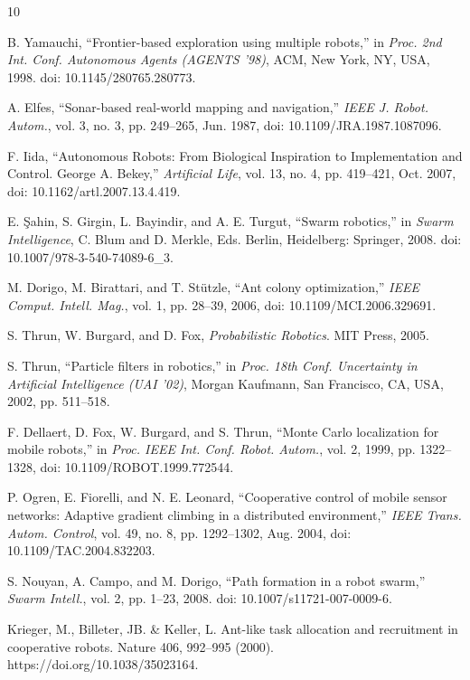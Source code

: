 \documentclass[lettersize,journal]{IEEEtran}
\begin{document}
\begin{thebibliography}{10}

B. Yamauchi, ``Frontier-based exploration using multiple robots,'' in \textit{Proc. 2nd Int. Conf. Autonomous Agents (AGENTS '98)}, ACM, New York, NY, USA, 1998. doi: 10.1145/280765.280773.

A. Elfes, ``Sonar-based real-world mapping and navigation,'' \textit{IEEE J. Robot. Autom.}, vol. 3, no. 3, pp. 249--265, Jun. 1987, doi: 10.1109/JRA.1987.1087096.

F. Iida, ``Autonomous Robots: From Biological Inspiration to Implementation and Control. George A. Bekey,'' \textit{Artificial Life}, vol. 13, no. 4, pp. 419--421, Oct. 2007, doi: 10.1162/artl.2007.13.4.419.

E. Şahin, S. Girgin, L. Bayindir, and A. E. Turgut, ``Swarm robotics,'' in \textit{Swarm Intelligence}, C. Blum and D. Merkle, Eds. Berlin, Heidelberg: Springer, 2008. doi: 10.1007/978-3-540-74089-6\_3.

M. Dorigo, M. Birattari, and T. Stützle, ``Ant colony optimization,'' \textit{IEEE Comput. Intell. Mag.}, vol. 1, pp. 28--39, 2006, doi: 10.1109/MCI.2006.329691.

S. Thrun, W. Burgard, and D. Fox, \textit{Probabilistic Robotics}. MIT Press, 2005.

S. Thrun, ``Particle filters in robotics,'' in \textit{Proc. 18th Conf. Uncertainty in Artificial Intelligence (UAI ’02)}, Morgan Kaufmann, San Francisco, CA, USA, 2002, pp. 511--518.

F. Dellaert, D. Fox, W. Burgard, and S. Thrun, ``Monte Carlo localization for mobile robots,'' in \textit{Proc. IEEE Int. Conf. Robot. Autom.}, vol. 2, 1999, pp. 1322--1328, doi: 10.1109/ROBOT.1999.772544.

P. Ogren, E. Fiorelli, and N. E. Leonard, ``Cooperative control of mobile sensor networks: Adaptive gradient climbing in a distributed environment,'' \textit{IEEE Trans. Autom. Control}, vol. 49, no. 8, pp. 1292--1302, Aug. 2004, doi: 10.1109/TAC.2004.832203.

S. Nouyan, A. Campo, and M. Dorigo, ``Path formation in a robot swarm,'' \textit{Swarm Intell.}, vol. 2, pp. 1--23, 2008. doi: 10.1007/s11721-007-0009-6.

Krieger, M., Billeter, JB. \& Keller, L. Ant-like task allocation and recruitment in cooperative robots. Nature 406, 992–995 (2000). https://doi.org/10.1038/35023164.


\end{thebibliography}
\end{document}
